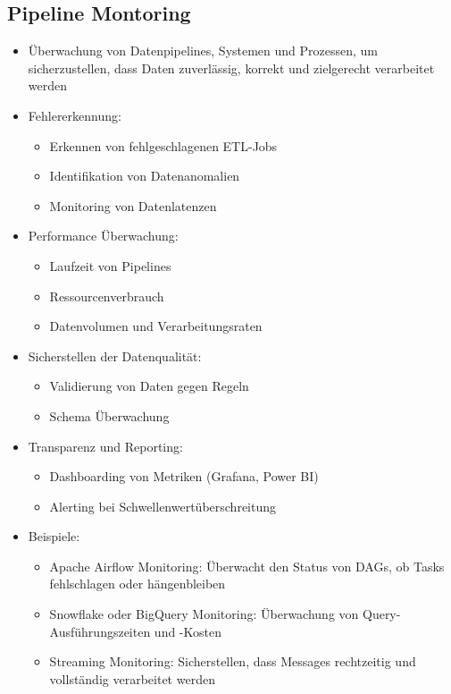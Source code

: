 \documentclass[11pt]{scrartcl}
\begin{document}
\subsection{Pipeline Montoring}
\begin{itemize}
	\item Überwachung von Datenpipelines, Systemen und Prozessen, um sicherzustellen, dass Daten zuverlässig, korrekt und zielgerecht verarbeitet werden
	\item Fehlererkennung:
	\begin{itemize}
		\item Erkennen von fehlgeschlagenen ETL-Jobs
		\item Identifikation von Datenanomalien
		\item Monitoring von Datenlatenzen
	\end{itemize}
	\item Performance Überwachung:
	\begin{itemize}
		\item Laufzeit von Pipelines
		\item Ressourcenverbrauch
		\item Datenvolumen und Verarbeitungsraten
	\end{itemize}
	\item Sicherstellen der Datenqualität:
	\begin{itemize}
		\item Validierung von Daten gegen Regeln
		\item Schema Überwachung
	\end{itemize}
	\item Transparenz und Reporting:
	\begin{itemize}
		\item Dashboarding von Metriken (Grafana, Power BI)
		\item Alerting bei Schwellenwertüberschreitung
	\end{itemize}
	\item Beispiele:
	\begin{itemize}
		\item Apache Airflow Monitoring: Überwacht den Status von DAGs, ob Tasks fehlschlagen oder hängenbleiben
		\item Snowflake oder BigQuery Monitoring: Überwachung von Query-Ausführungszeiten und -Kosten
		\item Streaming Monitoring: Sicherstellen, dass Messages rechtzeitig und vollständig verarbeitet werden
	\end{itemize}
\end{itemize}
\end{document}
